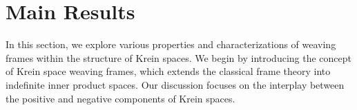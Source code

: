 \documentclass[article,12pt]{amsart}
\newtheorem{thm}{Theorem}[section]
\newtheorem{lem}[thm]{Lemma}
\begin{document}





\section{Main Results}

In this section, we explore various properties and characterizations of weaving frames within the structure of Krein spaces. We begin by introducing the concept of Krein space weaving frames, which extends the classical frame theory into indefinite inner product spaces. Our discussion focuses on  the interplay between the positive and negative components of Krein spaces.
\end{document}
